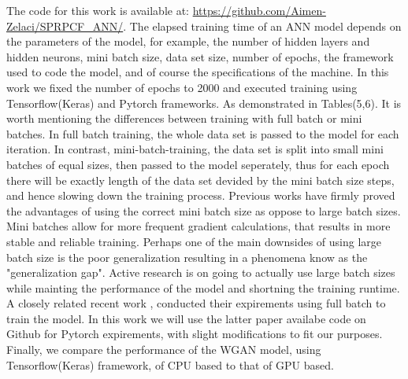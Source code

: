 \documentclass[draft, 10pt]{IEEEtran}
\begin{document}
The code for this work is available at: \url{https://github.com/Aimen-Zelaci/SPRPCF_ANN/}.
\newline
The elapsed training time of an ANN model depends on the parameters of the model, for example, the number of hidden layers and hidden neurons, mini batch size, data set size, number of epochs, the framework used to code the model, and of course the specifications of the machine.
In this work we fixed the number of epochs to 2000 and executed training using Tensorflow(Keras) and Pytorch frameworks. As demonstrated in Tables(5,6). It is worth mentioning the differences between training with full batch or mini batches. In full batch training, the whole data set is passed to the model for each iteration. In contrast, mini-batch-training, the data set is split into small mini batches of equal sizes, then passed to the model seperately, thus for each epoch there will be exactly length  of the data set devided by the mini batch size steps, and hence slowing down the training process. Previous works \cite{masters2018revisiting, keskar2016large} have firmly proved the advantages of using the correct mini batch size as oppose to large batch sizes. Mini batches allow for more frequent gradient calculations, that results in more stable and reliable training. Perhaps one of the main downsides of using large batch size is the poor generalization resulting in a phenomena know as the "generalization gap". Active research \cite{hoffer2017train} is on going to actually use large batch sizes while mainting the performance of the model and shortning the training runtime. A closely related recent work \cite{chugh2019machine}, conducted their expirements using full batch to train the model. In this work we will use the latter paper availabe code on Github for Pytorch expirements, with slight modifications to fit our purposes. Finally, we compare the performance of the WGAN model, using Tensorflow(Keras) framework, of CPU based to that of GPU based.
\end{document}
